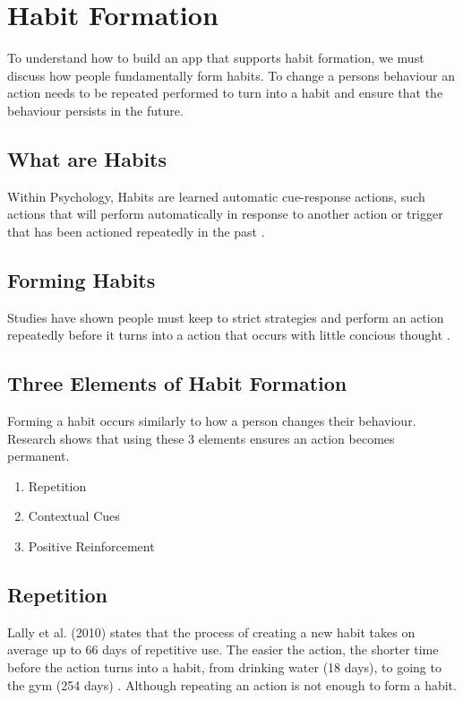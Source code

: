 \newpage

\section{Habit Formation}

To understand how to build an app that supports habit formation, we must discuss how people fundamentally form habits.\newline
\newline
To change a persons behaviour an action needs to be repeated performed to turn into a habit and ensure that the behaviour persists in the future.

\subsection{What are Habits}
Within Psychology, Habits are learned automatic cue-response actions, such actions that will perform automatically in response to another action or trigger that has been actioned repeatedly in the past \cite{article_the_habitual_consumer}.

\subsection{Forming Habits}
Studies have shown people must keep to strict strategies and perform an action repeatedly before it turns into a action that occurs with little concious thought \cite{article_promoting_habit_formation}.

\subsection{Three Elements of Habit Formation}
Forming a habit occurs similarly to how a person changes their behaviour. Research \cite{article_beyond_self_tracking_designing_apps} shows that using these 3 elements ensures an action becomes permanent.

\begin{enumerate}
  \item Repetition
  \item Contextual Cues
  \item Positive Reinforcement
\end{enumerate}

\subsection*{Repetition}
Lally et al. (2010) states that the process of creating a new habit takes on average up to 66 days of repetitive use. The easier the action, the shorter time before the action turns into a habit, from drinking water (18 days), to going to the gym (254 days) \cite{article_how_habits_formed_modelling_habit_formation}. Although repeating an action is not enough to form a habit.

